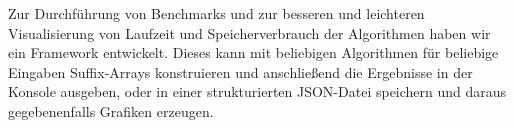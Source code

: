 Zur  Durchführung von Benchmarks und zur besseren und leichteren Visualisierung von Laufzeit und Speicherverbrauch der Algorithmen haben wir ein Framework entwickelt. Dieses kann mit beliebigen Algorithmen für beliebige Eingaben Suffix-Arrays konstruieren und anschließend die Ergebnisse in der Konsole ausgeben, oder in einer strukturierten JSON-Datei speichern und daraus gegebenenfalls Grafiken erzeugen.